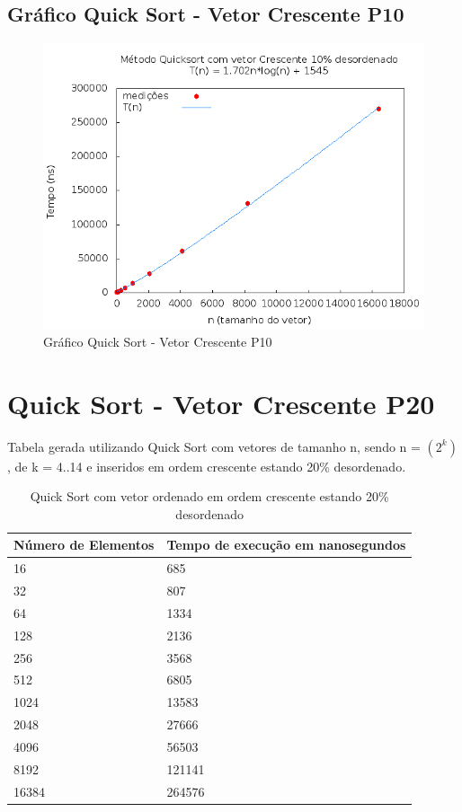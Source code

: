 \documentclass[12pt,a4paper,twoside]{report}
\begin{document}
\subsection{Gráfico Quick Sort - Vetor Crescente P10}
\begin{figure}[H]
    \centering
    \includegraphics[width=0.7\linewidth]{graficos/QuickSort/vIntCrescenteP10/vIntCrescenteP10.png}
  \caption{Gráfico Quick Sort - Vetor Crescente P10}
\end{figure}

\section{Quick Sort - Vetor Crescente P20}
Tabela gerada utilizando Quick Sort com vetores de tamanho n, sendo n = $(2^k)$, de k = 4..14 e inseridos em ordem crescente estando 20\% desordenado.
\begin{table}[H]
\centering
\caption{Quick Sort com vetor ordenado em ordem crescente estando 20\% desordenado}
\label{my-label}
\begin{tabular}{|l|l|}
\hline
\multicolumn{1}{|c|}{\textbf{Número de Elementos}} & \multicolumn{1}{c|}{\textbf{Tempo de execução em nanosegundos}} \\ \hline
16 & 685 \\ \hline
32 & 807 \\ \hline
64 & 1334 \\ \hline
128 & 2136 \\ \hline
256 & 3568 \\ \hline
512 & 6805 \\ \hline
1024 & 13583 \\ \hline
2048 & 27666 \\ \hline
4096 & 56503 \\ \hline
8192 & 121141 \\ \hline
16384 & 264576 \\ \hline
\end{tabular}
\end{table}
\end{document}

